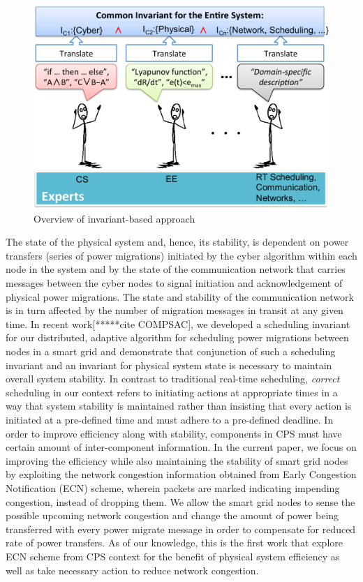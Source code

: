 \begin{figure}[htb]
  \begin{center}
     \includegraphics[width=0.9\columnwidth]{Figures/Invariant_Overview.pdf}
  \caption{Overview of invariant-based approach}
  \label{fig:invariant_conjunction}
  \end{center}
\end{figure}

The state of the physical system and, hence, its stability, is dependent on
power transfers (series of power migrations) initiated by the cyber algorithm
within each node in the system and by the state of the communication network
that carries messages between the cyber nodes to signal initiation and
acknowledgement of physical power migrations. The state and stability of the
communication network is in turn affected by the number of migration messages in
transit at any given time. In recent work[*****cite COMPSAC], we developed a 
scheduling invariant for our distributed, adaptive algorithm for scheduling power 
migrations between nodes in a smart grid and demonstrate that conjunction of such a
scheduling invariant and an invariant for physical system state is necessary to 
maintain overall system stability. In contrast to traditional real-time scheduling, 
{\em correct} scheduling in our context refers to initiating actions at appropriate 
times in a way that system stability is maintained rather than insisting that every 
action is initiated at a pre-defined time and must adhere to a pre-defined deadline. 
In order to improve efficiency along with stability, components in CPS must have 
certain amount of inter-component information. In the current paper, we focus on 
improving the efficiency while also maintaining the stability of smart grid nodes 
by exploiting the network congestion information obtained from Early Congestion 
Notification (ECN) scheme, wherein packets are marked indicating impending congestion,
instead of dropping them\cite{floyd1994tcp, ramakrishnan1999proposal, 
ramakrishnan2001addition}. We allow the smart grid nodes to sense the possible 
upcoming network congestion and change the amount of power being transferred with 
every power migrate message in order to compensate for reduced rate of power transfers.
As of our knowledge, this is the first work that explore ECN scheme from CPS context
for the benefit of physical system efficiency as well as take necessary action to 
reduce network congestion.


